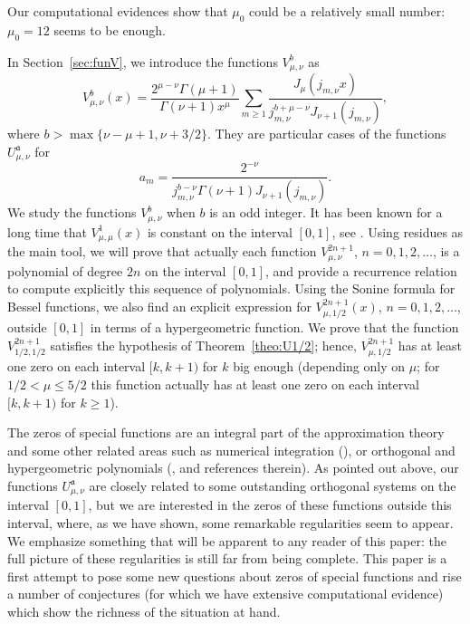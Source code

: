 \documentclass[10pt,a4paper]{article}
\numberwithin{equation}{section}
\theoremstyle{plain}
\theoremstyle{definition}
\newcommand{\aA}{\mathfrak{a}}
\begin{document}
Our computational evidences show that $\mu_0$ could be a relatively small number: $\mu_0=12$ seems to be enough.

In Section~\ref{sec:funV}, we introduce the functions $V_{\mu,\nu}^b$ as
\begin{equation}
\label{eq:gfs1}
   V_{\mu,\nu }^{b}(x) = \frac{2^{\mu-\nu}\Gamma(\mu+1)}{\Gamma(\nu+1)x^\mu}
   \sum_{m\ge 1} \frac{J_\mu (j_{m,\nu} x)}{j_{m,\nu}^{b+\mu-\nu} J_{\nu+1}(j_{m,\nu})},
\end{equation}
where $b>\max\{\nu-\mu+1,\nu+3/2\}$. They are particular cases of the functions $U_{\mu,\nu}^\aA$ for
\[
   a_m = \frac{2^{-\nu}}{j_{m,\nu}^{b-\nu} \Gamma(\nu+1)J_{\nu+1}(j_{m,\nu})}.
\]
We study the functions $V_{\mu,\nu}^b$ when $b$ is an odd integer. It has been known for a long time that $V_{\mu,\mu}^{1}(x)$ is constant on the interval $[0,1]$, see \cite[18.12(1), p.~581]{Wat}. Using residues as the main tool, we will prove that actually each function $V_{\mu,\nu}^{2n+1}$, $n=0,1,2,\dots$, is a polynomial of degree $2n$ on the interval $[0,1]$, and provide a recurrence relation to compute explicitly this sequence of polynomials. Using the Sonine formula for Bessel functions, we also find an explicit expression for $V_{\mu,1/2}^{2n+1}(x)$, $n=0,1,2,\dots$, outside $[0,1]$ in terms of a hypergeometric function. We prove that the function $V_{1/2,1/2}^{2n+1}$ satisfies the hypothesis of Theorem~\ref{theo:U1/2}; hence, $V_{\mu,1/2}^{2n+1}$ has at least one zero on each interval $[k,k+1)$ for $k$ big enough (depending only on $\mu$; for $1/2 < \mu \le 5/2$ this function actually has at least one zero on each interval $[k,k+1)$ for $k\ge 1$).

The zeros of special functions are an integral part of the approximation theory and some other related areas such as numerical integration (\cite{Temme-NIST}), or orthogonal and hypergeometric polynomials (\cite[Ch.~VI]{Sz}, \cite{DJM, MR, Cer, JWZ, DPVW, DMu} and references therein). As pointed out above, our functions $U_{\mu,\nu}^{\aA}$ are closely related to some outstanding orthogonal systems on the interval $[0,1]$, but we are interested in the zeros of these functions outside this interval, where, as we have shown, some remarkable regularities seem to appear.
We emphasize something that will be apparent to any reader of this paper:
the full picture of these regularities is still far from being complete. This
paper is a first attempt to pose some new questions about zeros of special functions
and rise a number of conjectures (for which we have extensive computational evidence) which show the richness of the situation at hand.
\end{document}

